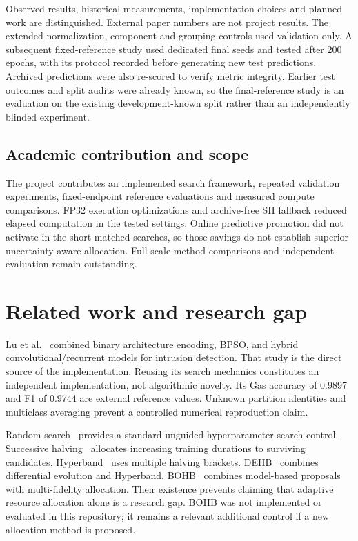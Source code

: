 \documentclass[11pt,a4paper]{report}
\begin{document}
Observed results, historical measurements, implementation choices and planned work are distinguished. External paper numbers are not project results. The extended normalization, component and grouping controls used validation only. A subsequent fixed-reference study used dedicated final seeds and tested after 200 epochs, with its protocol recorded before generating new test predictions. Archived predictions were also re-scored to verify metric integrity. Earlier test outcomes and split audits were already known, so the final-reference study is an evaluation on the existing development-known split rather than an independently blinded experiment.

\section{Academic contribution and scope}
The project contributes an implemented search framework, repeated validation experiments, fixed-endpoint reference evaluations and measured compute comparisons. FP32 execution optimizations and archive-free SH fallback reduced elapsed computation in the tested settings. Online predictive promotion did not activate in the short matched searches, so those savings do not establish superior uncertainty-aware allocation. Full-scale method comparisons and independent evaluation remain outstanding.

\chapter{Related work and research gap}
Lu et al.~\cite{lu2025} combined binary architecture encoding, BPSO, and hybrid convolutional/recurrent models for intrusion detection. That study is the direct source of the implementation. Reusing its search mechanics constitutes an independent implementation, not algorithmic novelty. Its Gas accuracy of 0.9897 and F1 of 0.9744 are external reference values. Unknown partition identities and multiclass averaging prevent a controlled numerical reproduction claim.

Random search~\cite{bergstra2012} provides a standard unguided hyperparameter-search control. Successive halving~\cite{jamieson2016} allocates increasing training durations to surviving candidates. Hyperband~\cite{li2018} uses multiple halving brackets. DEHB~\cite{awad2021} combines differential evolution and Hyperband. BOHB~\cite{falkner2018} combines model-based proposals with multi-fidelity allocation. Their existence prevents claiming that adaptive resource allocation alone is a research gap. BOHB was not implemented or evaluated in this repository; it remains a relevant additional control if a new allocation method is proposed.
\end{document}
